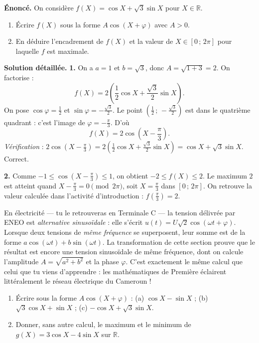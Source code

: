 \documentclass[11pt]{article}
\begin{document}
\begin{exoresolu}
\textbf{Énoncé.} On considère $f(X) = \cos X + \sqrt{3}\sin X$ pour $X \in \mathbb{R}$.
\begin{enumerate}
  \item Écrire $f(X)$ sous la forme $A\cos(X+\varphi)$ avec $A > 0$.
  \item En déduire l'encadrement de $f(X)$ et la valeur de $X \in [0\,;\,2\pi]$ pour laquelle $f$ est maximale.
\end{enumerate}
\tcblower
\textbf{Solution détaillée.}
\textbf{1.} On a $a = 1$ et $b = \sqrt{3}$, donc $A = \sqrt{1+3} = 2$. On factorise :
\[ f(X) = 2\left(\frac{1}{2}\cos X + \frac{\sqrt{3}}{2}\sin X\right). \]
On pose $\cos\varphi = \frac{1}{2}$ et $\sin\varphi = -\frac{\sqrt{3}}{2}$. Le point $\left(\frac{1}{2}\,;\,-\frac{\sqrt{3}}{2}\right)$ est dans le quatrième quadrant : c'est l'image de $\varphi = -\frac{\pi}{3}$. D'où
\[ f(X) = 2\cos\left(X - \frac{\pi}{3}\right). \]
\emph{Vérification} : $2\cos\left(X-\frac{\pi}{3}\right) = 2\left(\frac{1}{2}\cos X + \frac{\sqrt{3}}{2}\sin X\right) = \cos X + \sqrt{3}\sin X$. Correct.

\textbf{2.} Comme $-1 \leq \cos\left(X-\frac{\pi}{3}\right) \leq 1$, on obtient $-2 \leq f(X) \leq 2$. Le maximum $2$ est atteint quand $X - \frac{\pi}{3} = 0 \pmod{2\pi}$, soit $X = \frac{\pi}{3}$ dans $[0\,;\,2\pi]$. On retrouve la valeur calculée dans l'activité d'introduction : $f\left(\frac{\pi}{3}\right) = 2$.
\end{exoresolu}

\begin{savaistu}
En électricité — tu le retrouveras en Terminale C — la tension délivrée par ENEO est \emph{alternative sinusoïdale} : elle s'écrit $u(t) = U\sqrt{2}\cos(\omega t + \varphi)$. Lorsque deux tensions de \emph{même fréquence} se superposent, leur somme est de la forme $a\cos(\omega t) + b\sin(\omega t)$. La transformation de cette section prouve que le résultat est encore une tension sinusoïdale de même fréquence, dont on calcule l'amplitude $A = \sqrt{a^2+b^2}$ et la phase $\varphi$. C'est exactement le même calcul que celui que tu viens d'apprendre : les mathématiques de Première éclairent littéralement le réseau électrique du Cameroun !
\end{savaistu}

\begin{exercice}
\begin{enumerate}
  \item Écrire sous la forme $A\cos(X+\varphi)$ : \quad (a) $\cos X - \sin X$ ; \quad (b) $\sqrt{3}\cos X + \sin X$ ; \quad (c) $-\cos X + \sqrt{3}\sin X$.
  \item Donner, sans autre calcul, le maximum et le minimum de $g(X) = 3\cos X - 4\sin X$ sur $\mathbb{R}$.
\end{enumerate}
\end{exercice}
\end{document}
